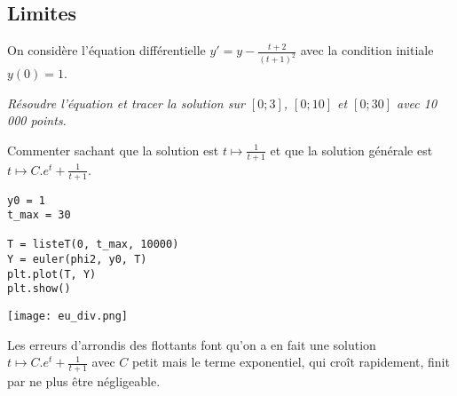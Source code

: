 \subsection{Limites}
On considère l'équation différentielle $\displaystyle y' = y -\frac{t+2}{(t+1)^2}$ avec la condition initiale $y(0)=1$.
\begin{Exercise}[label = Modification de solution]\it
Résoudre l'équation et tracer la solution sur $[0;3]$, $[0;10]$ et $[0;30]$ avec 10\,000 points.

Commenter sachant que la solution est $t \mapsto \frac 1 {t+1}$ et que la solution générale est $t \mapsto C.e^t + \frac 1 {t+1}$. 
\end{Exercise}
\begin{Answer}
\begin{lstlisting}
y0 = 1
t_max = 30

T = listeT(0, t_max, 10000)
Y = euler(phi2, y0, T)
plt.plot(T, Y)
plt.show()
\end{lstlisting}
\begin{center}
	\texttt{[image: eu\_div.png]}
\end{center}
Les erreurs d'arrondis des flottants font qu'on a en fait une solution $t \mapsto C.e^t + \frac 1 {t+1}$ avec $C$ petit mais le terme exponentiel, qui croît rapidement, finit par ne plus être négligeable.
\end{Answer}
\medskip

